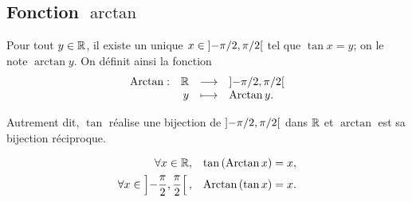 \documentclass{magnoliaold}
\begin{document}
\subsection{Fonction $\arctan$}

\begin{definition}[utile=-3]
Pour tout $y\in\mathbb{R}$, il existe un unique $x\in\left]-\pi/2,\pi/2\right[$
tel que $\tan x=y$; on le note $\arctan y$. On définit ainsi la fonction
\[\begin{array}[t]{lrcl} \displaystyle{\operatorname{Arctan}} : & \displaystyle{\mathbb{R}} & \longrightarrow & \displaystyle{\left]-\pi/2,\pi/2\right[} \\ & \displaystyle{y} & \longmapsto & \displaystyle{\operatorname{Arctan}y.} \end{array}\]
\end{definition}

\begin{remarqueUnique}
\remarque Autrement dit, $\tan$ réalise une bijection de $\left]-\pi/2,\pi/2\right[$ dans $\mathbb{R}$ et $\arctan$ est sa bijection réciproque.
\end{remarqueUnique}

\begin{proposition}[utile=-3]
\begin{eqnarray*}
\forall x\in\mathbb{R}, & & \tan\left(\operatorname{Arctan} x\right)=x,\\
\forall x\in\left]-\frac{\pi}{2},\frac{\pi}{2}\right[, & &
  \operatorname{Arctan}\left(\tan x\right)=x.  
\end{eqnarray*}
\end{proposition}
\end{document}

